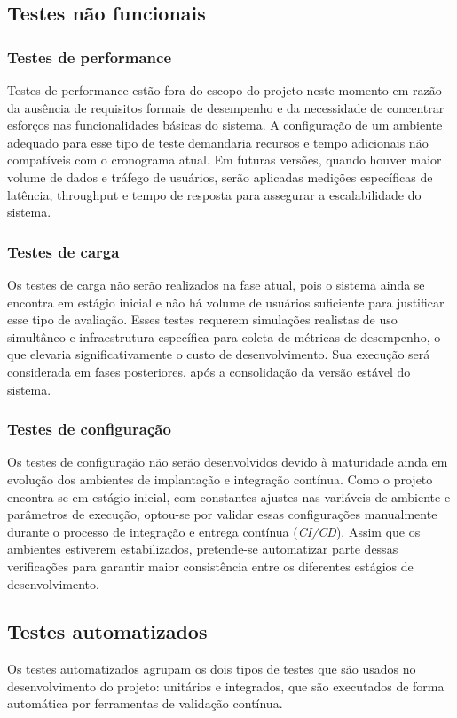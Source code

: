 \subsection{Testes não funcionais}

\subsubsection{Testes de performance}
Testes de performance estão fora do escopo do projeto neste momento em razão da ausência de requisitos formais de desempenho e da necessidade de concentrar esforços nas funcionalidades básicas do sistema.
A configuração de um ambiente adequado para esse tipo de teste demandaria recursos e tempo adicionais não compatíveis com o cronograma atual. 
Em futuras versões, quando houver maior volume de dados e tráfego de usuários, serão aplicadas medições específicas de latência, throughput e tempo de resposta para assegurar a escalabilidade do sistema.
\subsubsection{Testes de carga}
Os testes de carga não serão realizados na fase atual, pois o sistema ainda se encontra em estágio inicial e não há volume de usuários suficiente para justificar esse tipo de avaliação. 
Esses testes requerem simulações realistas de uso simultâneo e infraestrutura específica para coleta de métricas de desempenho, o que elevaria significativamente o custo de desenvolvimento. 
Sua execução será considerada em fases posteriores, após a consolidação da versão estável do sistema.
\subsubsection{Testes de configuração}
Os testes de configuração não serão desenvolvidos devido à maturidade ainda em evolução dos ambientes de implantação e integração contínua. 
Como o projeto encontra-se em estágio inicial, com constantes ajustes nas variáveis de ambiente e parâmetros de execução, 
optou-se por validar essas configurações manualmente durante o processo de integração e entrega contínua (\textit{CI/CD}). 
Assim que os ambientes estiverem estabilizados, pretende-se automatizar parte dessas verificações para garantir maior consistência entre os diferentes estágios de desenvolvimento.

\subsection{Testes automatizados}
Os testes automatizados agrupam os dois tipos de testes que são usados no desenvolvimento do projeto: unitários e integrados, que são executados de forma automática por ferramentas de validação contínua.

